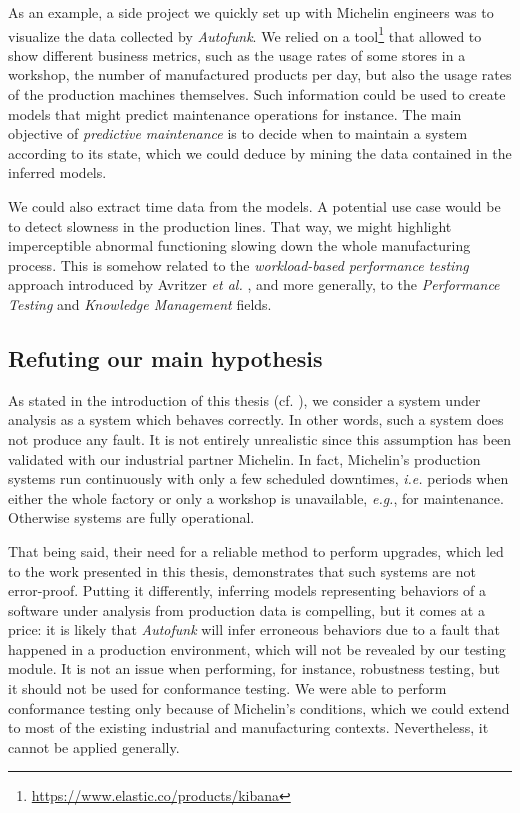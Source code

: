 As an example, a side project we quickly set up with Michelin
engineers was to visualize the data collected by
\textit{Autofunk}. We relied on a
tool\footnote{\url{https://www.elastic.co/products/kibana}} that
allowed to show different business metrics, such as the usage
rates of some stores in a workshop, the number of manufactured
products per day, but also the usage rates of the production
machines themselves. Such information could be used to create
models that might predict maintenance operations for instance.
The main objective of \emph{predictive maintenance}
\cite{mobley2002introduction} is to decide when to maintain a
system according to its state, which we could deduce by mining
the data contained in the inferred models.

We could also extract time data from the models. A potential use
case would be to detect slowness in the production lines. That
way, we might highlight imperceptible abnormal functioning
slowing down the whole manufacturing process. This is somehow
related to the \emph{workload-based performance testing} approach
introduced by Avritzer \emph{et al.} \cite{avritzer2002software},
and more generally, to the \emph{Performance Testing}
\cite{vokolos1998performance} and \emph{Knowledge Management}
\cite{pachidi2015performance} fields.


\subsection{Refuting our main hypothesis}
\label{sec:conclusion:testing:valid}

As stated in the introduction of this thesis (cf.
), we consider a system
under analysis as a system which behaves correctly. In other
words, such a system does not produce any fault. It is not
entirely unrealistic since this assumption has been validated
with our industrial partner Michelin. In fact, Michelin's
production systems run continuously with only a few scheduled
downtimes, \emph{i.e.} periods when either the whole factory or only a
workshop is unavailable, \emph{e.g.}, for maintenance. Otherwise systems
are fully operational.

That being said, their need for a reliable method to perform
upgrades, which led to the work presented in this thesis,
demonstrates that such systems are not error-proof. Putting it
differently, inferring models representing behaviors of a
software under analysis from production data is compelling, but
it comes at a price: it is likely that \textit{Autofunk} will
infer erroneous behaviors due to a fault that happened in a
production environment, which will not be revealed by our testing
module. It is not an issue when performing, for instance,
robustness testing, but it should not be used for conformance
testing. We were able to perform conformance testing only because
of Michelin's conditions, which we could extend to most of the
existing industrial and manufacturing contexts. Nevertheless, it
cannot be applied generally.


